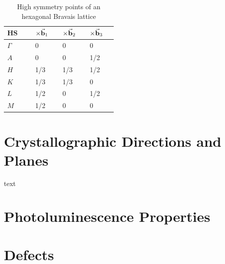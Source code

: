 \begin{table}[tbh!]
	\centering
	\caption{High symmetry points of an hexagonal Bravais lattice}
	\label{tab:HS}
	\begin{tabular}[t]{K{0.15\linewidth}K{0.1\linewidth}K{0.1\linewidth}K{0.1\linewidth}}
	\toprule
	\textbf{HS} & $\times \va{b}_1$ & $\times \va{b}_2$ & $\times \va{b}_3$ \\ \midrule
	$\Gamma$ & 0 & 0 & 0 \\
	$A$ & 0 & 0 & 1/2 \\
	$H$ & 1/3 & 1/3 & 1/2 \\
	$K$ & 1/3 & 1/3 & 0 \\
	$L$ & 1/2 & 0 & 1/2 \\
	$M$ & 1/2 & 0 & 0 \\ \bottomrule
	\end{tabular}
\end{table}

\clearpage


\section{Crystallographic Directions and Planes}
text
\section{Photoluminescence Properties}
\section{Defects}

